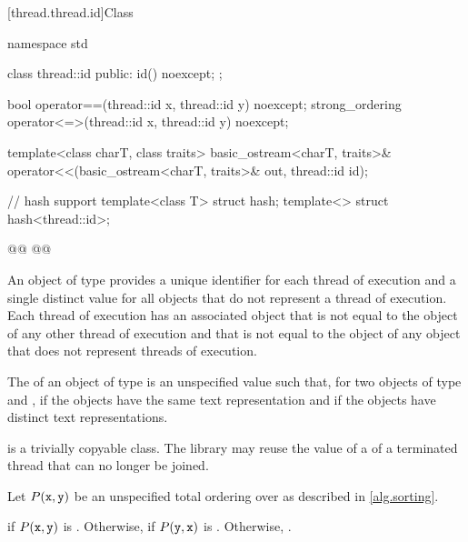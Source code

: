 \documentclass{wg21}
\begin{document}
[thread.thread.id]{Class }

%
%
\begin{codeblock}
    namespace std {
        class thread::id {
            public:
            id() noexcept;
        };

        bool operator==(thread::id x, thread::id y) noexcept;
        strong_ordering operator<=>(thread::id x, thread::id y) noexcept;

        template<class charT, class traits>
        basic_ostream<charT, traits>&
        operator<<(basic_ostream<charT, traits>& out, thread::id id);

        // hash support
        template<class T> struct hash;
        template<> struct hash<thread::id>;

        @@
        @@
    }
\end{codeblock}

\pnum
An object of type  provides a unique identifier for
each thread of execution and a single distinct value for all 
objects that do not represent a thread of
execution. Each thread of execution has an
associated  object that is not equal to the
 object of any other thread of execution and that is not
equal to the  object of any  object that
does not represent threads of execution.

\begin{addedblock}
The  of an object of type 
is an unspecified value such that, for two objects of type   and ,
if  the  objects have the same text
representation and if  the  objects have
distinct text representations.
\end{addedblock}

\pnum
{} is a trivially copyable class.
The library may reuse the value of a  of a terminated thread that can no longer be joined.


\begin{itemdescr}
    \pnum
    Let $P(\texttt{x}, \texttt{y})$ be
    an unspecified total ordering over 
    as described in \ref{alg.sorting}.

    \pnum
    \returns
     if $P(\texttt{x}, \texttt{y})$ is .
    Otherwise, 
    if $P(\texttt{y}, \texttt{x})$ is .
    Otherwise, .
\end{itemdescr}
\end{document}
